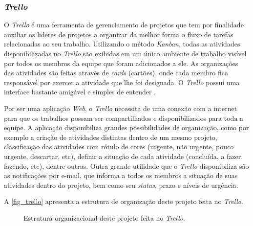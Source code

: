 \subsubsection{\textit{Trello}}

O \textit{Trello} é uma ferramenta de gerenciamento de projetos que tem por finalidade auxiliar os lideres de projetos a organizar da melhor forma o fluxo de tarefas relacionadas ao seu trabalho. Utilizando o método \textit{Kanban}, todas as atividades disponibilizadas no \textit{Trello} são exibidas em um único ambiente de trabalho visível por todos os membros da equipe que foram adicionados a ele. As organizações das atividades são feitas através de \textit{cards} (cartões), onde cada membro fica responsável por exercer a atividade que lhe foi designada. O \textit{Trello } possui uma interface bastante amigável e simples de entender \cite{TRELLO2017}. 

Por ser uma aplicação \textit{Web}, o \textit{Trello} necessita de uma conexão com a internet para que os trabalhos possam ser compartilhados e disponibilizados para toda a equipe. A aplicação disponibiliza grandes possibilidades de organização, como por exemplo a criação de atividades distintas dentro de um mesmo projeto, classificação das atividades com rótulo de cores (urgente, não urgente, pouco urgente, descartar, etc), definir a situação de cada atividade (concluída, a fazer, fazendo, etc), dentre outras. Outra grande utilidade que o \textit{Trello} disponibiliza são as notificações por e-mail, que informa a todos os membros a situação de suas atividades dentro do projeto, bem como seu \textit{status}, prazo e níveis de urgência.

A \autoref{fig_trello} apresenta a estrutura de organização deste projeto feita no \textit{Trello}.

\begin{figure}[h]
	\caption{\label{fig_trello}Estrutura organizacional deste projeto feita no \textit{Trello}.}
	\begin{center}
	\end{center}
	\centering {}
\end{figure}